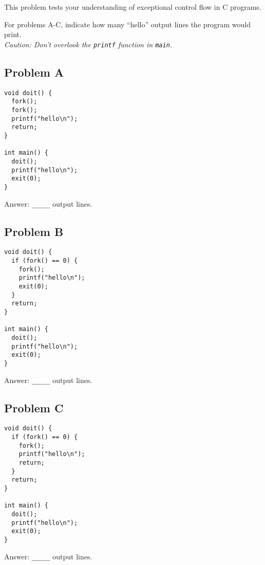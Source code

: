 \begin{problem}{8} 
This problem tests your understanding of
exceptional control flow in C programs.

For problems A-C, indicate how 
many ``hello'' output lines the program would print.\\
{\em Caution: Don't overlook the {\tt printf} function in {\tt main}.}
\end{problem}

\subsection*{Problem A}
\begin{minipage}[c]{3in}
\small
\begin{verbatim}
void doit() {
  fork();
  fork();
  printf("hello\n");
  return;
}

int main() {
  doit();
  printf("hello\n");
  exit(0);
}
\end{verbatim}
\end{minipage}
\begin{minipage}[c]{3in}
Answer: \verb:_____: output lines.
\end{minipage}

\subsection*{Problem B}
\begin{minipage}[c]{3in}
\small
\begin{verbatim}
void doit() {
  if (fork() == 0) {
    fork();
    printf("hello\n");
    exit(0);
  }
  return;
}

int main() {
  doit();
  printf("hello\n");
  exit(0);
}
\end{verbatim}
\end{minipage}
\begin{minipage}[c]{3in}
Answer: \verb:_____: output lines.
\end{minipage}

\subsection*{Problem C}
\begin{minipage}[c]{3in}
\small
\begin{verbatim}
void doit() {
  if (fork() == 0) {
    fork();
    printf("hello\n");
    return;
  }
  return;
}

int main() {
  doit();
  printf("hello\n");
  exit(0);
}
\end{verbatim}
\end{minipage}
\begin{minipage}[c]{3in}
Answer: \verb:_____: output lines.
\end{minipage}


